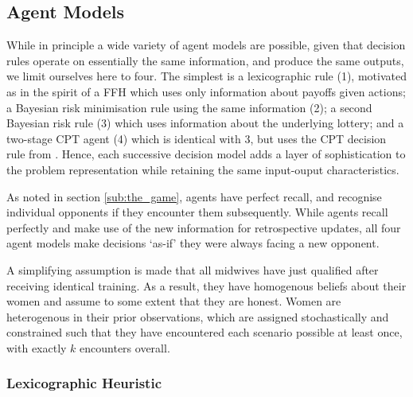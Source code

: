 \subsection{Agent Models}
\label{sub:the_agents}

While in principle a wide variety of agent models are possible, given that decision rules operate on essentially the same information, and produce the same outputs, we limit ourselves here to four. The simplest is a lexicographic rule (1), motivated as in the spirit of a \ac{FFH} \citep{Gigerenzer2004} which uses only information about payoffs given actions; a Bayesian risk minimisation rule using the same information (2); a second Bayesian risk rule (3) which uses information about the underlying lottery; and a two-stage \ac{CPT} \cite{Hau2008} agent (4) which is identical with 3, but uses the \ac{CPT} decision rule from \cite{Tversky1992}. Hence, each successive decision model adds a layer of sophistication to the problem representation while retaining the same input-ouput characteristics.

As noted in section \ref{sub:the_game}, agents have perfect recall, and recognise individual opponents if they encounter them subsequently. While agents recall perfectly and make use of the new information for retrospective updates, all four agent models make decisions `as-if' they were always facing a new opponent.

A simplifying assumption is made that all midwives have just qualified after receiving identical training. As a result, they have homogenous beliefs about their women and assume to some extent that they are honest.
Women are heterogenous in their prior observations, which are assigned stochastically and constrained such that they have encountered each scenario possible at least once, with exactly \(k\) encounters overall.


\subsubsection{Lexicographic Heuristic}
\label{sub:lexico}

